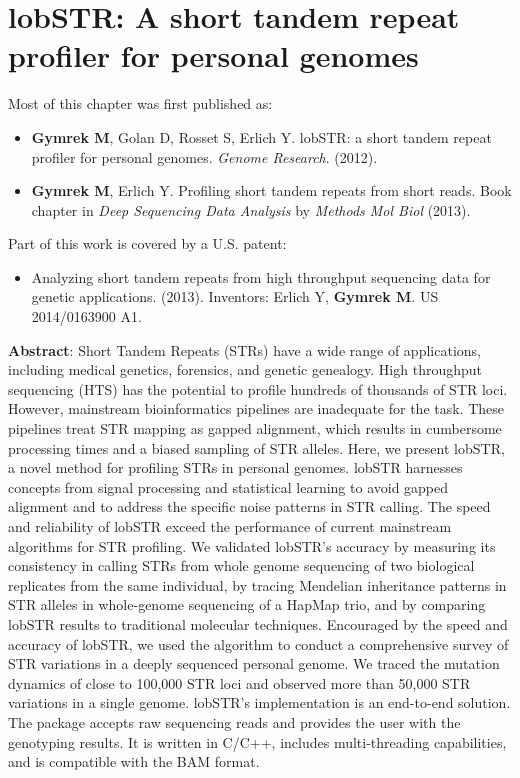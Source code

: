 \chapter{lobSTR: A short tandem repeat profiler for personal genomes}
\label{chap:lobstr}

\hzline

Most of this chapter was first published as:

\begin{itemize}
\item[] \textbf{Gymrek M}, Golan D, Rosset S, Erlich Y. lobSTR: a short tandem repeat profiler for personal genomes. \emph{Genome Research}. (2012).
\item[] \textbf{Gymrek M}, Erlich Y. Profiling short tandem repeats from short reads. Book chapter in \emph{Deep Sequencing Data Analysis} by \emph{Methods Mol Biol} (2013).

\end{itemize}

Part of this work is covered by a U.S. patent:

\begin{itemize}
\item[] Analyzing short tandem repeats from high throughput sequencing data for genetic applications. (2013). Inventors: Erlich Y, \textbf{Gymrek M}. US 2014/0163900 A1.
\end{itemize}

\hzline

\textbf{Abstract}: Short Tandem Repeats (STRs) have a wide range of applications, including medical genetics, forensics, and genetic genealogy. High throughput sequencing (HTS) has the potential to profile hundreds of thousands of STR loci. However, mainstream bioinformatics pipelines are inadequate for the task. These pipelines treat STR mapping as gapped alignment, which results in cumbersome processing times and a biased sampling of STR alleles. Here, we present lobSTR, a novel method for profiling STRs in personal genomes. lobSTR harnesses concepts from signal processing and statistical learning to avoid gapped alignment and to address the specific noise patterns in STR calling. The speed and reliability of lobSTR exceed the performance of current mainstream algorithms for STR profiling. We validated lobSTR's accuracy by measuring its consistency in calling STRs from whole genome sequencing of two biological replicates from the same individual, by tracing Mendelian inheritance patterns in STR alleles in whole-genome sequencing of a HapMap trio, and by comparing lobSTR results to traditional molecular techniques. Encouraged by the speed and accuracy of lobSTR, we used the algorithm to conduct a comprehensive survey of STR variations in a deeply sequenced personal genome. We traced the mutation dynamics of close to 100,000 STR loci and observed more than 50,000 STR variations in a single genome. lobSTR's implementation is an end-to-end solution. The package accepts raw sequencing reads and provides the user with the genotyping results. It is written in C/C++, includes multi-threading capabilities, and is compatible with the BAM format.

